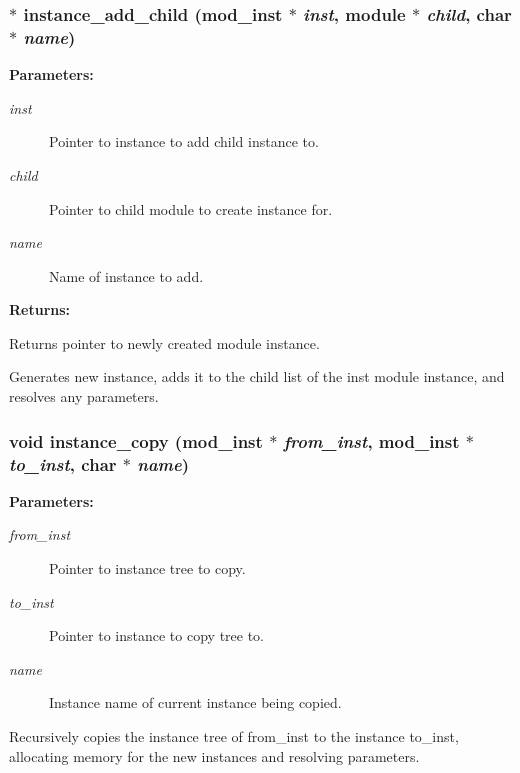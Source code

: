 \subsubsection{ $\ast$ instance\_\-add\_\-child ({\bf mod\_\-inst} $\ast$ {\em inst}, {\bf module} $\ast$ {\em child}, char $\ast$ {\em name})}\label{instance_8c_a6}


\begin{Desc}
\item[{\bf Parameters: }]\par
\begin{description}
\item[
{\em inst}]Pointer to instance to add child instance to. \item[
{\em child}]Pointer to child module to create instance for. \item[
{\em name}]Name of instance to add.

\end{description}
\end{Desc}
\begin{Desc}
\item[{\bf Returns: }]\par
Returns pointer to newly created module instance.

\end{Desc}
Generates new instance, adds it to the child list of the inst module instance, and resolves any parameters. 
\subsubsection{\setlength{\rightskip}{0pt plus 5cm}void instance\_\-copy ({\bf mod\_\-inst} $\ast$ {\em from\_\-inst}, {\bf mod\_\-inst} $\ast$ {\em to\_\-inst}, char $\ast$ {\em name})}\label{instance_8c_a7}


\begin{Desc}
\item[{\bf Parameters: }]\par
\begin{description}
\item[
{\em from\_\-inst}]Pointer to instance tree to copy. \item[
{\em to\_\-inst}]Pointer to instance to copy tree to. \item[
{\em name}]Instance name of current instance being copied.

\end{description}
\end{Desc}
Recursively copies the instance tree of from\_\-inst to the instance  to\_\-inst, allocating memory for the new instances and resolving parameters. 
